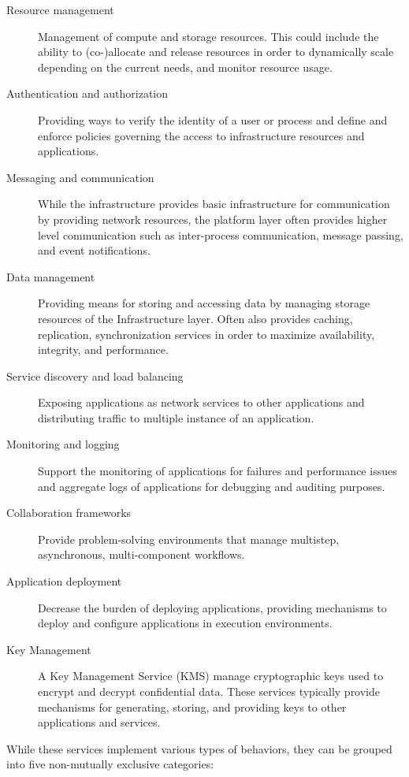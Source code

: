 \begin{description}
  \item[Resource management]
    Management of compute and storage resources. This could include the ability
    to (co-)allocate and release resources in order to dynamically scale
    depending on the current needs, and monitor resource usage.
  \item[Authentication and authorization]
    Providing ways to verify the identity of a user or process and define and
    enforce policies governing the access to infrastructure resources and
    applications.
  \item[Messaging and communication]
    While the infrastructure provides basic infrastructure for communication by
    providing network resources, the platform layer often provides higher level
    communication such as inter-process communication, message passing, and
    event notifications.
  \item[Data management]
    Providing means for storing and accessing data by managing storage resources
    of the Infrastructure layer. Often also provides caching, replication,
    synchronization services in order to maximize availability, integrity, and
    performance.
  \item[Service discovery and load balancing]
    Exposing applications as network services to other applications and
    distributing traffic to multiple instance of an application.
  \item[Monitoring and logging]
    Support the monitoring of applications for failures and performance issues
    and aggregate logs of applications for debugging and auditing purposes.
  \item[Collaboration frameworks]
    Provide problem-solving environments that manage multistep, asynchronous,
    multi-component workflows.
  \item[Application deployment]
    Decrease the burden of deploying applications, providing mechanisms to
    deploy and configure applications in execution environments.
  \item[Key Management]
    A Key Management Service (KMS) manage cryptographic keys used to encrypt and
    decrypt confidential data. These services typically provide mechanisms for
    generating, storing, and providing keys to other applications and services.
\end{description}

While these services implement various types of behaviors, they can be grouped
into five non-mutually exclusive categories:

